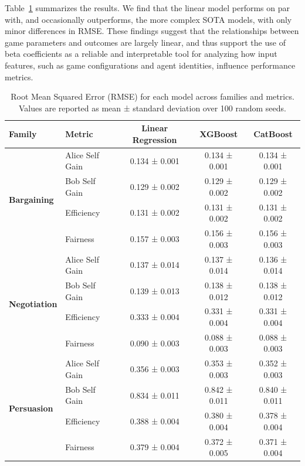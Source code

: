Table~\ref{tab:rmse_results} summarizes the results. We find that the linear model performs on par with, and occasionally outperforms, the more complex SOTA models, with only minor differences in RMSE. These findings suggest that the relationships between game parameters and outcomes are largely linear, and thus support the use of beta coefficients as a reliable and interpretable tool for analyzing how input features, such as game configurations and agent identities, influence performance metrics.

\begin{table}[ht]
\centering
\caption{Root Mean Squared Error (RMSE) for each model across families and metrics. Values are reported as mean ± standard deviation over 100 random seeds.}
\begin{tabular}{llccc}
\toprule
\textbf{Family} & \textbf{Metric} & \textbf{Linear Regression} & \textbf{XGBoost} & \textbf{CatBoost} \\
\midrule
\multirow{4}{*}{\textbf{Bargaining}} 
 & Alice Self Gain     & 0.134 ± 0.001 & 0.134 ± 0.001 & 0.134 ± 0.001 \\
 & Bob Self Gain       & 0.129 ± 0.002 & 0.129 ± 0.002 & 0.129 ± 0.002 \\
 & Efficiency          & 0.131 ± 0.002 & 0.131 ± 0.002 & 0.131 ± 0.002 \\
 & Fairness            & 0.157 ± 0.003 & 0.156 ± 0.003 & 0.156 ± 0.003 \\
\midrule
\multirow{4}{*}{\textbf{Negotiation}} 
 & Alice Self Gain     & 0.137 ± 0.014 & 0.137 ± 0.014 & 0.136 ± 0.014 \\
 & Bob Self Gain       & 0.139 ± 0.013 & 0.138 ± 0.012 & 0.138 ± 0.012 \\
 & Efficiency          & 0.333 ± 0.004 & 0.331 ± 0.004 & 0.331 ± 0.004 \\
 & Fairness            & 0.090 ± 0.003 & 0.088 ± 0.003 & 0.088 ± 0.003 \\
\midrule
\multirow{4}{*}{\textbf{Persuasion}} 
 & Alice Self Gain     & 0.356 ± 0.003 & 0.353 ± 0.003 & 0.352 ± 0.003 \\
 & Bob Self Gain       & 0.834 ± 0.011 & 0.842 ± 0.011 & 0.840 ± 0.011 \\
 & Efficiency          & 0.388 ± 0.004 & 0.380 ± 0.004 & 0.378 ± 0.004 \\
 & Fairness            & 0.379 ± 0.004 & 0.372 ± 0.005 & 0.371 ± 0.004 \\
\bottomrule
\end{tabular}
\label{tab:rmse_results}
\end{table}


